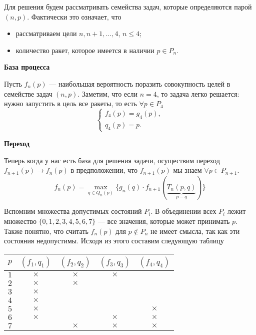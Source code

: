 Для решения будем рассматривать семейства задач, которые определяются парой $(n, p)$. Фактически это означает, что

\begin{itemize}[nosep]
	\item рассматриваем цели $n, n+1, \dots, 4$, $n \le 4$;
	
	\item количество ракет, которое имеется в наличии $p \in P_n$.
\end{itemize}

\bigskip

\textbf{База процесса}

Пусть $f_n(p)$ --- наибольшая вероятность поразить совокупность целей в семействе задач $(n, p)$. Заметим, что если $n = 4$, то задача легко решается: нужно запустить в цель все ракеты, то есть $\forall p \in P_4$
\[
\begin{cases}
	f_4(p) = g_4(p), \\
	q_4(p) = p.
\end{cases}
\]

\bigskip

\textbf{Переход}

Теперь когда у нас есть база для решения задачи, осуществим переход $f_{n+1}(p) \to f_n(p)$ в предположении, что $f_{n+1}(p)$ мы знаем $\forall p \in P_{n + 1}$.
\[
\boxed{f_n(p) = \max_{q \in Q_n(p)} \Big\{ g_n(q) \cdot f_{n + 1}(\underbrace{T_n(p, q)}_{p - q}) \Big\}}\tag{**}
\]

Вспомним множества допустимых состояний $P_i$. В объединении всех $P_i$ лежит множество $\{0, 1, 2, 3, 4, 5, 6, 7\}$ --- все значения, которые может принимать $p$. Также понятно, что считать $f_n(p)$ для $p \notin P_n$ не имеет смысла, так как эти состояния недопустимы. Исходя из этого составим следующую таблицу

\begin{table}[H]
	\centering
	\begin{tabular}{ | c | c | c | c | c | } 
		\hline
		$p$ & $(f_1, q_1)$ & $(f_2, q_2)$ & $(f_3, q_3)$ & $(f_4, q_4)$ \\ 
		\hline
		$1$ & $\times$ & $\times$ & $\times$ & \\\hline
		$2$ & $\times$ & $\times$ & & \\\hline
		$3$ & $\times$ & & & \\\hline
		$4$ & $\times$ & & & \\\hline
		$5$ & $\times$ & & & $\times$ \\\hline
		$6$ & $\times$ & & $\times$ & $\times$ \\\hline
		$7$ & & $\times$ & $\times$ & $\times$ \\\hline
	\end{tabular}
\end{table}

